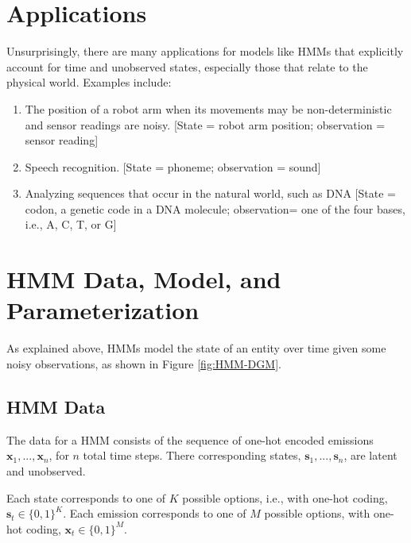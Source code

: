\section{Applications}

Unsurprisingly, there are many applications for models like HMMs that explicitly account for time and unobserved states, especially those that relate to the physical world. Examples include:
\begin{enumerate}
    \item The position of a robot arm when its movements may be non-deterministic and sensor readings are noisy. [State = robot arm position; observation  = sensor reading]
    \item Speech recognition. [State = phoneme; observation = sound]
    \item Analyzing sequences that occur in the natural world, such as DNA [State = codon, a genetic code in a DNA molecule; observation= one of the four bases, i.e., A, C, T, or G]
\end{enumerate}

\section{HMM Data, Model, and Parameterization}

As explained above, HMMs model the state of an entity over time given some noisy observations, as shown in Figure \ref{fig:HMM-DGM}.

\subsection{HMM Data}

The data for a HMM consists of the sequence of one-hot encoded emissions $\textbf{x}_1, ..., \textbf{x}_n$, for $n$ total time steps. There corresponding states, $\textbf{s}_1, ..., \textbf{s}_n$, are latent and unobserved.

Each state corresponds to one of $K$ possible options, i.e., with one-hot coding,
$\textbf{s}_t \in \{0,1\}^K$. Each emission corresponds to one of $M$ possible options, with one-hot coding, $\textbf{x}_t \in \{0,1\}^M$.



